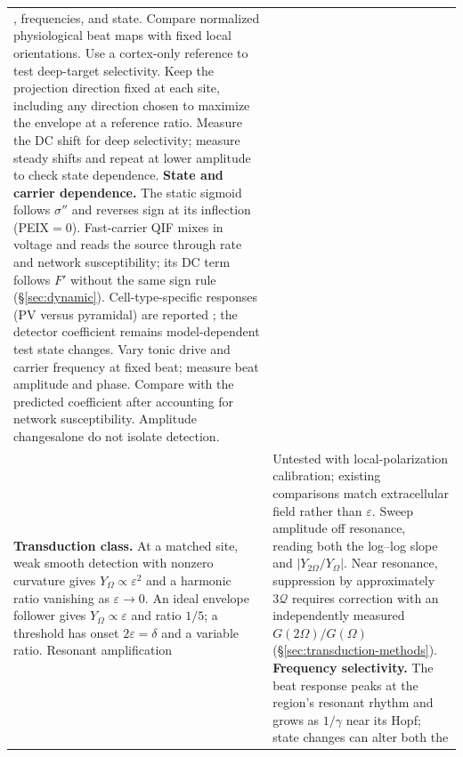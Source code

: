 \documentclass[11pt,a4paper]{article}
\newcommand{\Sig}{\sigma}
\providecommand{\DIFaddtex}[1]{{\protect\color{blue} \sf #1}} %
\providecommand{\DIFdeltex}[1]{{\protect\color{red} \scriptsize #1}} %
\providecommand{\DIFaddFL}[1]{\DIFadd{#1}} %
\providecommand{\DIFdelFL}[1]{\DIFdel{#1}} %
\providecommand{\DIFaddbeginFL}{} %
\providecommand{\DIFaddendFL}{} %
\providecommand{\DIFdelbeginFL}{} %
\providecommand{\DIFdelendFL}{} %
\providecommand{\DIFadd}[1]{\texorpdfstring{\DIFaddtex{#1}}{#1}} %
\providecommand{\DIFdel}[1]{\texorpdfstring{\DIFdeltex{#1}}{}} %
\begin{document}
\begin{table}[htbp]
\begin{tabular}{@{}>{\raggedright\arraybackslash}p{}
 >{\raggedright\arraybackslash}p{}@{}}
{and target-to-reference ratios, using }\DIFdelendFL \DIFaddbeginFL \DIFaddFL{,
frequencies, and state. Compare normalized physiological beat maps with fixed
local orientations. Use }\DIFaddendFL a cortex-only reference \DIFdelbeginFL \DIFdelFL{to test deep-target
selectivity. Keep the projection direction fixed at each site,
including any direction chosen to maximize the envelope at a reference ratio.
Measure the DC shift }\DIFdelendFL \DIFaddbeginFL \DIFaddFL{for deep selectivity; measure
steady shifts }\DIFaddendFL and repeat at lower amplitude to \DIFdelbeginFL \DIFdelFL{check state dependence.
 }%
\DIFdelFL{\textbf{State and carrier dependence.} The static sigmoid follows $\Sig''$ and
reverses sign at its inflection (PEIX$=0$). Fast-carrier QIF mixes in voltage and
reads the source through rate and network susceptibility; its DC term follows
$F'$ without the same sign rule (\S\ref{sec:dynamic}).
}%
\DIFdelFL{Cell-type-specific responses (PV versus pyramidal) are reported
\cite{caldas2024}; the detector coefficient remains model-dependent}\DIFdelendFL \DIFaddbeginFL \DIFaddFL{test state changes}\DIFaddendFL . \DIFdelbeginFL %
\DIFdelFL{Vary tonic drive and carrier frequency at fixed beat; measure beat amplitude
and phase. Compare with the predicted coefficient after accounting for network
susceptibility. Amplitude changesalone do not isolate detection. }\DIFdelendFL \\[4pt]
\DIFdelbeginFL \DIFdelFL{\textbf{Transduction class.} At a matched site, weak smooth detection with nonzero
curvature gives $Y_\Omega\propto\varepsilon^2$ and a harmonic ratio vanishing as
$\varepsilon\to0$. An ideal envelope follower gives $Y_\Omega\propto\varepsilon$
and ratio $1/5$; a threshold has onset $2\varepsilon=\delta$ and a variable ratio.
}\DIFdelendFL \DIFaddbeginFL \DIFaddFL{Resonant amplification }\DIFaddendFL & \DIFdelbeginFL \DIFdelFL{Untested with local-polarization calibration; existing comparisons match
extracellular field rather than $\varepsilon$.
}%
\DIFdelFL{Sweep amplitude off resonance, reading both the log--log slope and
$|Y_{2\Omega}/Y_\Omega|$. Near resonance, suppression by approximately
$3\mathcal Q$ requires correction with an independently measured
$G(2\Omega)/G(\Omega)$ (\S\ref{sec:transduction-methods}). }%
\DIFdelFL{\textbf{Frequency selectivity.} The beat response peaks at the region's resonant
rhythm and grows as $1/\gamma$ near its Hopf; state changes can alter both the
}
\end{tabular}
\end{table}
\end{document}
